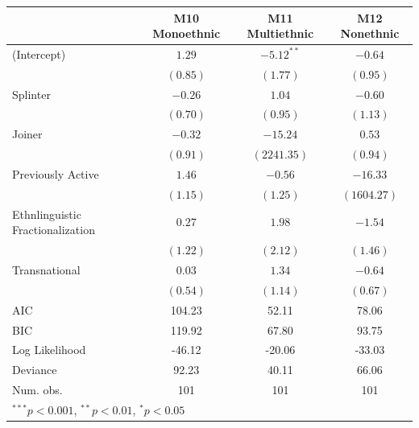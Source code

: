 \documentclass[12pt,]{book}
\let\origtable\table
\let\endorigtable\endtable
\renewenvironment{table}[1][2] {
    \singlespacing
    \expandafter\origtable\expandafter[H]
} {
    \endorigtable
}
\theoremstyle{definition}
\theoremstyle{definition}
\theoremstyle{definition}
\theoremstyle{remark}
\begin{document}
\begin{table}
\begin{center}
\begin{tabular}{l c c c }
\hline
 & M10 Monoethnic & M11 Multiethnic & M12 Nonethnic \\
\hline
(Intercept)                      & $1.29$   & $-5.12^{**}$ & $-0.64$     \\
                                 & $(0.85)$ & $(1.77)$     & $(0.95)$    \\
Splinter                         & $-0.26$  & $1.04$       & $-0.60$     \\
                                 & $(0.70)$ & $(0.95)$     & $(1.13)$    \\
Joiner                           & $-0.32$  & $-15.24$     & $0.53$      \\
                                 & $(0.91)$ & $(2241.35)$  & $(0.94)$    \\
Previously Active                & $1.46$   & $-0.56$      & $-16.33$    \\
                                 & $(1.15)$ & $(1.25)$     & $(1604.27)$ \\
Ethnlinguistic Fractionalization & $0.27$   & $1.98$       & $-1.54$     \\
                                 & $(1.22)$ & $(2.12)$     & $(1.46)$    \\
Transnational                    & $0.03$   & $1.34$       & $-0.64$     \\
                                 & $(0.54)$ & $(1.14)$     & $(0.67)$    \\
\hline
AIC                              & 104.23   & 52.11        & 78.06       \\
BIC                              & 119.92   & 67.80        & 93.75       \\
Log Likelihood                   & -46.12   & -20.06       & -33.03      \\
Deviance                         & 92.23    & 40.11        & 66.06       \\
Num. obs.                        & 101      & 101          & 101         \\
\hline
\multicolumn{4}{l}{\scriptsize{$^{***}p<0.001$, $^{**}p<0.01$, $^*p<0.05$}}
\end{tabular}
\caption{Logit Models of Rebel Group Ethnic Composition (Secessionist Conflicts Only)}
\label{tab:splintcomp-sec}
\end{center}
\end{table}
\end{document}
